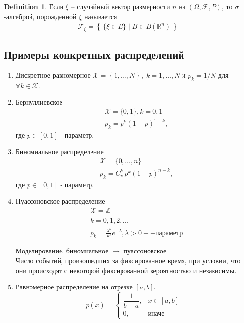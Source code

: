 \documentclass[a4paper]{article}
\theoremstyle{plain}
\theoremstyle{remark}
\theoremstyle{definition}
\newtheorem{definition}{Definition}
\newcommand{\setRn}{\mathbb{R}^n}
\newcommand{\setZ}{\mathbb{Z}}
\newcommand{\setF}{\mathcal{F}}
\newcommand{\combru}[2]{C_{#1}^{#2}} %
\newcommand{\comb}[2]{\combru{#1}{#2}}
\newcommand{\braces}[1]{\left\{ #1 \right\}} %
\newcommand{\condset}[2]{\braces{\, #1 \mid #2 \,}} %
\begin{document}
\begin{definition}
  Если $\xi$ -- случайный вектор размерности $n$ на $(\Omega, \setF, P)$, 
  то $\sigma$-алгеброй, порожденной $\xi$ называется
  \begin{align*}
    \setF_\xi = \condset{\{ \xi \in B \}}{B \in B(\setRn)}
  \end{align*}
\end{definition}

\subsection{Примеры конкретных распределений}

\begin{enumerate}
	\item 
		Дискретное равномерное $\mathcal{X} = \braces{1, \ldots, N},\;
		k = 1, \ldots, N$ и $p_k = 1 / N$ для $\forall k \in \mathcal{X}$.
	
	\item 
		Бернуллиевское
		\begin{align*}
			&\mathcal{X} = \{ 0, 1 \}, k = 0, 1\\
			&p_k = p^k (1 - p)^{1 - k},
		\end{align*}
		где $p \in [0, 1]$ - параметр.
		
	\item 
		Биномиальное распределение
		\begin{align*}
			&\mathcal{X} = \{ 0, \ldots , n\}\\
			&p_k = \comb{n}{k}\, p^k (1 - p)^{n - k},
		\end{align*}
		где $p \in [0, 1]$ - параметр.

	\item
		Пуассоновское распределение
		\begin{align*}
			&\mathcal{X} = \setZ_+\\
			&k = 0, 1, 2, \ldots \\
			&p_k = \frac{\lambda^{k}}{k!} e^{-\lambda}, \lambda > 0 -- \text{параметр}
		\end{align*}

		Моделирование: биномиальное $\rightarrow$ пуассоновское \\
		Число событий, произошедших за фиксированное время, при условии, что они происходят с некоторой фиксированной вероятностью и независимы.
	\item 
			Равномерное распределение на отрезке $[a, b]$.
			\begin{equation*}
				p(x) =
				\begin{cases}
					\dfrac{1}{b - a},&x \in [a, b]\\
					0				,&\text{иначе}
				\end{cases}		
			\end{equation*}
			

\end{enumerate}
\end{document}
